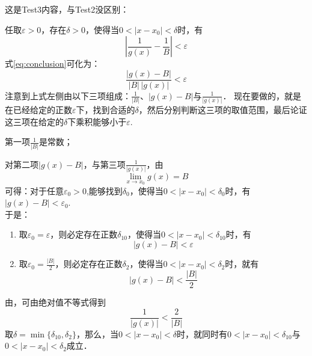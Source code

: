 这是Test3内容，与Test2没区别：\par
任取$\varepsilon>0$，存在$\delta>0$，使得当$0<|x-x_0|<\delta$时，有
    \begin{equation}
        \left|\frac{1}{g(x)}-\frac{1}{B}\right|<\varepsilon
    \end{equation}
式\eqref{eq:conclusion}可化为：
\begin{equation}
    \frac{|g(x)-B|}{|B|\,|g(x)|}<\varepsilon
\end{equation}
注意到上式左侧由以下三项组成：$\frac1{|B|}$、$|g(x)-B|$与$\frac1{|g(x)|}$．
现在要做的，就是在已经给定的正数$\varepsilon$下，找到合适的$\delta$，然后分别判断这三项的取值范围，最后论证这三项在给定的$\delta$下乘积能够小于$\varepsilon$.\par
第一项$\frac1{|B|}$是常数；\par
对第二项$|g(x)-B|$，与第三项$\frac1{|g(x)|}$，由
\begin{equation}
    \lim_{x \to x_0} g(x)=B
\end{equation}
可得：对于任意$\varepsilon_0>0$,能够找到$\delta_0$，使得当$0<|x-x_0|<\delta_0$时，有$|g(x)-B|<\varepsilon_0$.\\
于是：
\begin{enumerate}[label=\circled{\arabic*}]
    \item 取$\varepsilon_0=\varepsilon$，则必定存在正数$\delta_{10}$，使得当$0<|x-x_0|<\delta_{10}$时，有
        \begin{equation}
            |g(x)-B|<\varepsilon
        \end{equation}
    \item 取$\varepsilon_0=\frac{|B|}{2}$，则必定存在正数$\delta_2$，使得当$0<|x-x_0|<\delta_2$时，就有
        \begin{equation}
            |g(x)-B|<\frac{|B|}{2}
        \end{equation}
\end{enumerate}
由，可由绝对值不等式得到
    \begin{equation}
        \frac1{|g(x)|}<\frac{2}{|B|}
    \end{equation}
取$\delta=\min\{\delta_{10},\delta_2\}$，那么，当$0<|x-x_0|<\delta$时，就同时有$0<|x-x_0|<\delta_{10}$与$0<|x-x_0|<\delta_2$成立．\\
